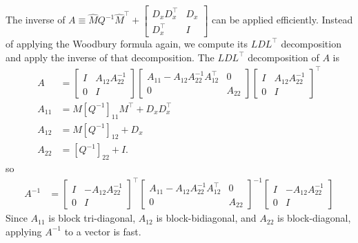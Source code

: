 \documentclass{article}
\begin{document}
The inverse of $A\equiv \hat{M} Q^{-1} \hat{M}^\top + \begin{bmatrix}
        D_x D_x^\top & D_x \\ D_x^\top & I
    \end{bmatrix}
$ can be applied efficiently. Instead of applying the Woodbury formula again, we compute its $LDL^\top$ decomposition and apply the inverse of that decomposition. The $LDL^\top$ decomposition of $A$ is
\begin{align}
    A      & =
    \begin{bmatrix}
        I & A_{12} A_{22}^{-1} \\ 0 & I
    \end{bmatrix}
    \begin{bmatrix}
        A_{11} - A_{12} A_{22}^{-1} A_{12}^\top & 0      \\
        0                                       & A_{22}
    \end{bmatrix}
    \begin{bmatrix}
        I & A_{12} A_{22}^{-1} \\ 0 & I
    \end{bmatrix}
    ^\top \nonumber                                                      \\
    A_{11} & = M \left[Q^{-1}\right]_{11} M^\top +D_x D_x^\top \nonumber \\
    A_{12} & = M\left[Q^{-1}\right]_{12} + D_x \nonumber                 \\
    A_{22} & = \left[Q^{-1}\right]_{22} + I.
\end{align}
so
\begin{align}
    A^{-1} & = \begin{bmatrix}
        I & -A_{12} A_{22}^{-1} \\ 0 & I
    \end{bmatrix}
    ^\top
    \begin{bmatrix}
        A_{11} - A_{12} A_{22}^{-1} A_{12}^\top & 0      \\
        0                                       & A_{22}
    \end{bmatrix}
    ^{-1}
    \begin{bmatrix}
        I & -A_{12} A_{22}^{-1} \\ 0 & I
    \end{bmatrix}
\end{align}
Since $A_{11}$ is block tri-diagonal, $A_{12}$ is block-bidiagonal, and $A_{22}$ is block-diagonal, applying $A^{-1}$ to a vector is fast.
\end{document}
